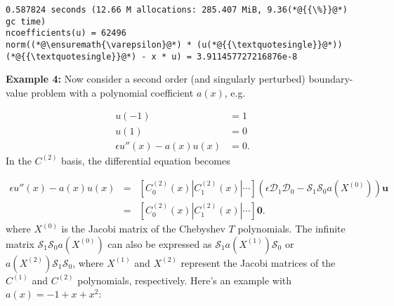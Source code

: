 \documentclass[12pt,a4paper]{article}
\begin{document}
\begin{lstlisting}
0.587824 seconds (12.66 M allocations: 285.407 MiB, 9.36(*@{{\%}}@*) gc time)
ncoefficients(u) = 62496
norm((*@\ensuremath{\varepsilon}@*) * (u(*@{{\textquotesingle}}@*))(*@{{\textquotesingle}}@*) - x * u) = 3.911457727216876e-8
\end{lstlisting}


\textbf{Example 4:} Now consider a second order (and singularly perturbed) boundary-value problem with a polynomial coefficient $a(x)$, e.g.


\begin{align*}
u(-1) &= 1\\
u(1) &= 0\\
\epsilon u''(x) - a(x)u(x) &= 0.
\end{align*}
In the $C^{(2)}$ basis, the differential equation becomes


\begin{eqnarray*}
\epsilon u''(x) - a(x)u(x)  &=& \left[ C_0^{(2)}(x) | C_1^{(2)}(x) | \cdots \right]\left(\epsilon\mathcal{D}_1\mathcal{D}_0  - \mathcal{S}_1\mathcal{S}_0a(X^{(0)})  \right) \mathbf{u} \\
 &=& \left[ C_0^{(2)}(x) | C_1^{(2)}(x) | \cdots \right]\mathbf{0}.
 \end{eqnarray*}
where $X^{(0)}$ is the Jacobi matrix of the Chebyshev $T$ polynomials. The infinite matrix $\mathcal{S}_1\mathcal{S}_0a(X^{(0)})$ can also be expressed as $\mathcal{S}_1a(X^{(1)})\mathcal{S}_0$ or $a(X^{(2)})\mathcal{S}_1\mathcal{S}_0$, where $X^{(1)}$ and $X^{(2)}$ represent the Jacobi matrices of the $C^{(1)}$ and $C^{(2)}$ polynomials, respectively.  Here's an example with $a(x) = -1 + x + x^2$:
\end{document}
